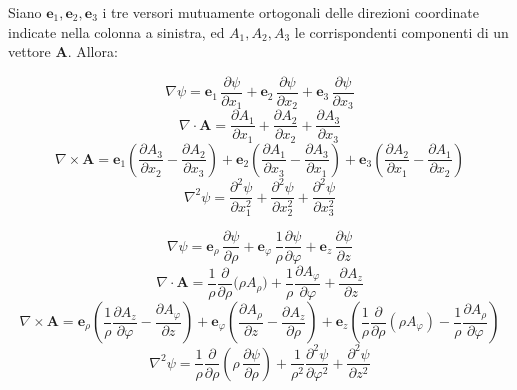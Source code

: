 
Siano $\mathbf e_1,\mathbf e_2,\mathbf e_3$ i tre versori mutuamente ortogonali delle direzioni
coordinate indicate nella colonna a sinistra, ed $A_1,A_2,A_3$ le corrispondenti componenti di un
vettore $\mathbf A$. Allora:


\begin{tcolorbox}[title={\normalsize \textbf{Coordinate cartesiane} \ $(x_1,x_2,x_3)$}]
\[
\nabla \psi = \mathbf e_1\,\frac{\partial \psi}{\partial x_1}
            + \mathbf e_2\,\frac{\partial \psi}{\partial x_2}
            + \mathbf e_3\,\frac{\partial \psi}{\partial x_3}
\]
\[
\nabla\!\cdot\!\mathbf A = \frac{\partial A_1}{\partial x_1}
                         + \frac{\partial A_2}{\partial x_2}
                         + \frac{\partial A_3}{\partial x_3}
\]
\[
\nabla\!\times\!\mathbf A =
\mathbf e_1\!\left(\frac{\partial A_3}{\partial x_2}-\frac{\partial A_2}{\partial x_3}\right)
+ \mathbf e_2\!\left(\frac{\partial A_1}{\partial x_3}-\frac{\partial A_3}{\partial x_1}\right)
+ \mathbf e_3\!\left(\frac{\partial A_2}{\partial x_1}-\frac{\partial A_1}{\partial x_2}\right)
\]
\[
\nabla^2 \psi=\frac{\partial^2\psi}{\partial x_1^2}
             + \frac{\partial^2\psi}{\partial x_2^2}
             + \frac{\partial^2\psi}{\partial x_3^2}
\]
\end{tcolorbox}

\begin{tcolorbox}[title={\normalsize \textbf{Coordinate cilindriche} \ $(\rho,\varphi,z)$}]
\[
\nabla \psi = \mathbf e_\rho\,\frac{\partial \psi}{\partial \rho}
            + \mathbf e_\varphi\,\frac{1}{\rho}\frac{\partial \psi}{\partial \varphi}
            + \mathbf e_z\,\frac{\partial \psi}{\partial z}
\]
\[
\nabla\!\cdot\!\mathbf A =
\frac{1}{\rho}\frac{\partial}{\partial \rho}\!\big(\rho A_\rho\big)
+ \frac{1}{\rho}\frac{\partial A_\varphi}{\partial \varphi}
+ \frac{\partial A_z}{\partial z}
\]
\[
\nabla\!\times\!\mathbf A =
\mathbf e_\rho\!\left(\frac{1}{\rho}\frac{\partial A_z}{\partial \varphi}-\frac{\partial A_\varphi}{\partial z}\right)
+ \mathbf e_\varphi\!\left(\frac{\partial A_\rho}{\partial z}-\frac{\partial A_z}{\partial \rho}\right)
+ \mathbf e_z\!\left(\frac{1}{\rho}\frac{\partial}{\partial \rho}(\rho A_\varphi)-\frac{1}{\rho}\frac{\partial A_\rho}{\partial \varphi}\right)
\]
\[
\nabla^2\psi=\frac{1}{\rho}\frac{\partial}{\partial \rho}\!\left(\rho\,\frac{\partial\psi}{\partial \rho}\right)
            + \frac{1}{\rho^2}\frac{\partial^2\psi}{\partial \varphi^2}
            + \frac{\partial^2\psi}{\partial z^2}
\]
\end{tcolorbox}

